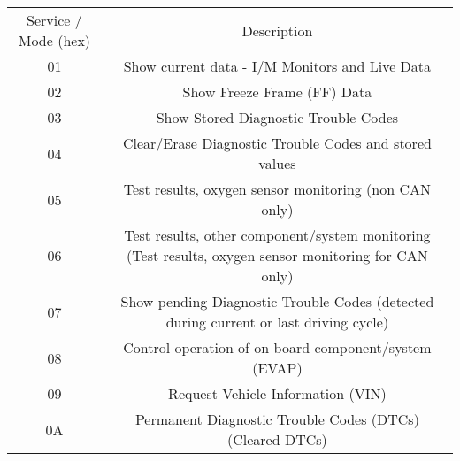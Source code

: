 \begin{table}[]
\begin{tabular}{cc}
\rowcolor[HTML]{656565} 
{\color[HTML]{FFFFFF} Service / Mode (hex)} & {\color[HTML]{FFFFFF} Description}                                                                    \\
01                                          & Show current data - I/M Monitors and Live Data                                                        \\
02                                          & Show Freeze Frame (FF) Data                                                                           \\
03                                          & Show Stored Diagnostic Trouble Codes                                                                  \\
04                                          & Clear/Erase Diagnostic Trouble Codes and stored values                                                \\
05                                          & Test results, oxygen sensor monitoring (non CAN only)                                                 \\
06                                           & Test results, other component/system monitoring (Test results, oxygen sensor monitoring for CAN only) \\
07                                           & Show pending Diagnostic Trouble Codes (detected during current or last driving cycle)                 \\
08                                           & Control operation of on-board component/system (EVAP)                                                 \\
09                                          & Request Vehicle Information (VIN)                                                                     \\
0A                                          & Permanent Diagnostic Trouble Codes (DTCs) (Cleared DTCs)                                             
\end{tabular}
\end{table}